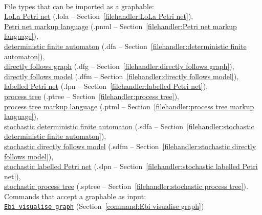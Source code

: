 {\begin{itemize}
\\File types that can be imported as a graphable: \\\null\qquad\hyperref[filehandler:LoLa Petri net]{LoLa Petri net} (.lola -- Section~\ref{filehandler:LoLa Petri net}), \\\null\qquad\hyperref[filehandler:Petri net markup language]{Petri net markup language} (.pnml -- Section~\ref{filehandler:Petri net markup language}), \\\null\qquad\hyperref[filehandler:deterministic finite automaton]{deterministic finite automaton} (.dfa -- Section~\ref{filehandler:deterministic finite automaton}), \\\null\qquad\hyperref[filehandler:directly follows graph]{directly follows graph} (.dfg -- Section~\ref{filehandler:directly follows graph}), \\\null\qquad\hyperref[filehandler:directly follows model]{directly follows model} (.dfm -- Section~\ref{filehandler:directly follows model}), \\\null\qquad\hyperref[filehandler:labelled Petri net]{labelled Petri net} (.lpn -- Section~\ref{filehandler:labelled Petri net}), \\\null\qquad\hyperref[filehandler:process tree]{process tree} (.ptree -- Section~\ref{filehandler:process tree}), \\\null\qquad\hyperref[filehandler:process tree markup language]{process tree markup language} (.ptml -- Section~\ref{filehandler:process tree markup language}), \\\null\qquad\hyperref[filehandler:stochastic deterministic finite automaton]{stochastic deterministic finite automaton} (.sdfa -- Section~\ref{filehandler:stochastic deterministic finite automaton}), \\\null\qquad\hyperref[filehandler:stochastic directly follows model]{stochastic directly follows model} (.sdfm -- Section~\ref{filehandler:stochastic directly follows model}), \\\null\qquad\hyperref[filehandler:stochastic labelled Petri net]{stochastic labelled Petri net} (.slpn -- Section~\ref{filehandler:stochastic labelled Petri net}), \\\null\qquad\hyperref[filehandler:stochastic process tree]{stochastic process tree} (.sptree -- Section~\ref{filehandler:stochastic process tree}).
\\Commands that accept a graphable as input: \\\null\qquad\hyperref[command:Ebi visualise graph]{\texttt{Ebi visualise graph}} (Section~\ref{command:Ebi visualise graph})

\end{itemize}}
